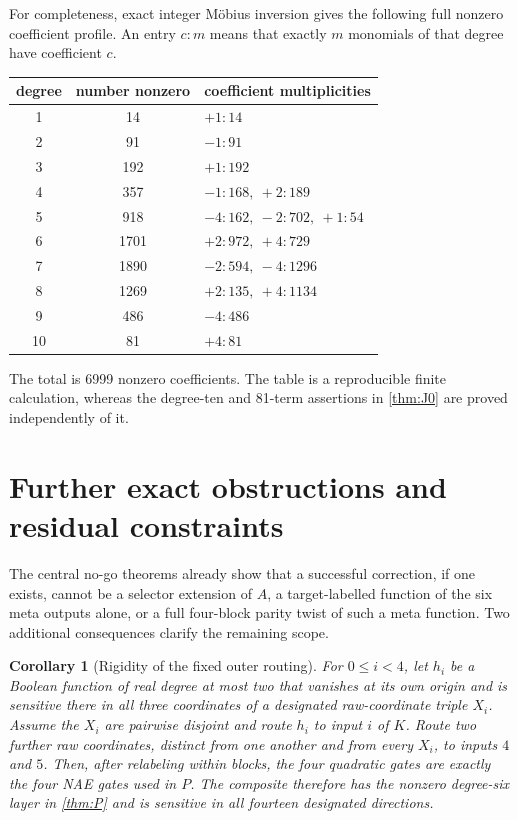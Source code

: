 \documentclass[11pt]{article}
\newtheorem{corollary}[theorem]{Corollary}
\theoremstyle{definition}
\begin{document}
For completeness, exact integer M\"obius inversion gives the following full
nonzero coefficient profile.  An entry \(c:m\) means that exactly \(m\)
monomials of that degree have coefficient \(c\).
\begin{center}
\begin{tabular}{ccl}
\toprule
degree & number nonzero & coefficient multiplicities\\
\midrule
1  & 14   & \(+1:14\)\\
2  & 91   & \(-1:91\)\\
3  & 192  & \(+1:192\)\\
4  & 357  & \(-1:168,\ +2:189\)\\
5  & 918  & \(-4:162,\ -2:702,\ +1:54\)\\
6  & 1701 & \(+2:972,\ +4:729\)\\
7  & 1890 & \(-2:594,\ -4:1296\)\\
8  & 1269 & \(+2:135,\ +4:1134\)\\
9  & 486  & \(-4:486\)\\
10 & 81   & \(+4:81\)\\
\bottomrule
\end{tabular}
\end{center}
The total is 6999 nonzero coefficients.  The table is a reproducible finite
calculation, whereas the degree-ten and 81-term assertions in
\cref{thm:J0} are proved independently of it.

\section{Further exact obstructions and residual constraints}

The central no-go theorems already show that a successful correction, if one
exists, cannot be a selector extension of \(A\), a target-labelled function of
the six meta outputs alone, or a full four-block parity twist of such a meta
function.  Two additional consequences clarify the remaining scope.

\begin{corollary}[Rigidity of the fixed outer routing]
For \(0\le i<4\), let \(h_i\) be a Boolean function of real degree at most two
that vanishes at its own origin and is sensitive there in all three
coordinates of a designated raw-coordinate triple \(X_i\).  Assume the
\(X_i\) are pairwise disjoint and route \(h_i\) to input \(i\) of \(K\).
Route two further raw coordinates, distinct from one another and from every
\(X_i\), to inputs \(4\) and \(5\).  Then, after relabeling within blocks, the
four quadratic gates are exactly the four NAE gates used in \(P\).  The
composite therefore has the nonzero degree-six layer in \cref{thm:P} and is
sensitive in all fourteen designated directions.
\end{corollary}
\end{document}
